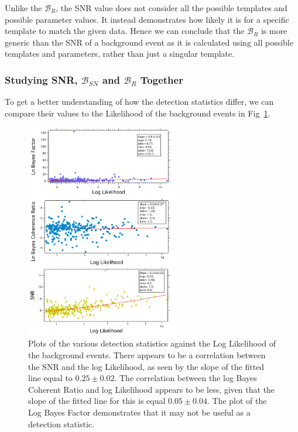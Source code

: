 \documentclass{article}
\begin{document}
 
 
 Unlike the $\mathcal{B}_{R}$, the SNR value does not consider all the possible templates and possible parameter values. It instead demonstrates how likely it is for a specific template to match the given data. Hence we can conclude that the $\mathcal{B}_{R}$ is more generic than the SNR of a background event as it is calculated using all possible templates and parameters, rather than just a singular template. \\
 
 \subsubsection{ Studying SNR, $\mathcal{B}_{SN}$ and $\mathcal{B}_{R}$ Together}

 
 To get a better understanding of how the detection statistics differ, we can compare their values to the Likelihood of the background events in Fig~\ref{Fig:SeparateDetectionStatisticVSlnL}.\\
       
       
       \begin{figure}[h!]
       	\centering
       	\includegraphics[width=0.6\textwidth]{Figures/DetectionStatisticComparison.pdf} 
       	\caption{Plots of the various detection statistics against the Log Likelihood of the background events. There appears to be a correlation between the SNR and the log Likelihood, as seen by the slope of the fitted line equal to $0.25\pm0.02$. The correlation between the log Bayes Coherent Ratio and log Likelihood appears to be less, given that the slope of the fitted line for this is equal $0.05\pm0.04$. The plot of the Log Bayes Factor demonstrates that it may not be useful as a detection statistic.}
       	\label{Fig:SeparateDetectionStatisticVSlnL}
       \end{figure}
                
\end{document}
